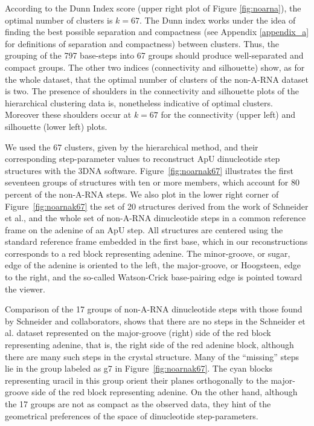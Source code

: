 According  to  the  Dunn  Index  score (upper  right  plot  of  Figure
\ref{fig:noarna}), the optimal number  of clusters is $k=67$. The Dunn
index works under the idea of finding the best possible separation and
compactness   (see  Appendix   \ref{appendix_a}  for   definitions  of
separation and  compactness) between  clusters. Thus, the  grouping of
the 797  base-steps into 67  groups should produce  well-separated and
compact groups.   The other two indices  (connectivity and silhouette)
show, as for the whole dataset, that the optimal number of clusters of
the  non-A-RNA dataset  is  two.   The presence  of  shoulders in  the
connectivity and silhouette plots  of the hierarchical clustering data
is,  nonetheless  indicative  of  optimal  clusters.   Moreover  these
shoulders  occur  at $k=67$  for  the  connectivity  (upper left)  and
silhouette (lower left) plots.

We used the  67 clusters, given by the  hierarchical method, and their
corresponding  step-parameter values  to reconstruct  ApU dinucleotide
step  structures with  the 3DNA  software.  Figure~\ref{fig:noarnak67}
illustrates the first seventeen groups  of structures with ten or more
members, which account for 80 percent of the non-A-RNA steps.  We also
plot in  the lower right corner of  Figure~\ref{fig:noarnak67} the set
of   20   structures  derived   from   the   work   of  Schneider   et
al.\cite{schneider2004}, and  the whole set  of non-A-RNA dinucleotide
steps in a common reference frame  on the adenine of an ApU step.  All
structures are centered using the standard reference frame embedded in
the  first base,  which in  our reconstructions  corresponds to  a red
block representing  adenine.  The minor-groove, or sugar,  edge of the
adenine is oriented to the  left, the major-groove, or Hoogsteen, edge
to  the right,  and the  so-called Watson-Crick  base-pairing  edge is
pointed toward the viewer.

Comparison of the 17 groups of non-A-RNA dinucleotide steps with those
found by Schneider and collaborators, shows that there are no steps in
the Schneider  et al. dataset represented on  the major-groove (right)
side of the red block representing adenine, that is, the right side of
the  red adenine  block, although  there are  many such  steps  in the
crystal  structure. Many  of the  ``missing'' steps  lie in  the group
labeled  as   g7  in  Figure~\ref{fig:noarnak67}.    The  cyan  blocks
representing uracil in this  group orient their planes orthogonally to
the major-groove  side of the  red block representing adenine.  On the
other hand, although the 17 groups  are not as compact as the observed
data,  they  hint of  the  geometrical  preferences  of the  space  of
dinucleotide step-parameters.

